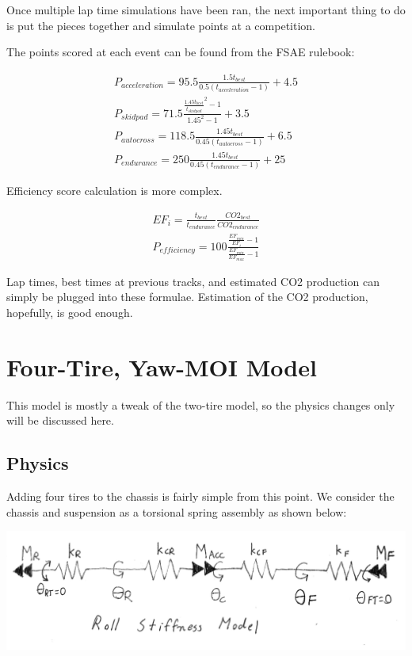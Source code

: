 \documentclass{article}
\begin{document}
Once multiple lap time simulations have been ran, the next important thing to do is put the pieces together and simulate points at a competition.

The points scored at each event can be found from the FSAE rulebook:

\begin{align}
	P_{acceleration} = 95.5 \frac{1.5 t_{best}}{0.5 (t_{acceleration} - 1)} + 4.5 \\
	P_{skidpad} = 71.5 \frac{\frac{1.45 t_{best}}{t_{skidpad}}^2 -1}{1.45^2 - 1} + 3.5 \\
	P_{autocross} = 118.5 \frac{1.45 t_{best}}{0.45 (t_{autocross} - 1)} + 6.5 \\
	P_{endurance} = 250 \frac{1.45 t_{best}}{0.45 (t_{endurance} - 1)} + 25
\end{align}

Efficiency score calculation is more complex.

\begin{align}
	EF_i = \frac{t_{best}}{t_{endurance}} \frac{CO2_{best}}{CO2_{endurance}} \\
	P_{efficiency} = 100 \frac{\frac{EF_{min}}{EF_i}-1}{\frac{EF_{min}}{EF_{max}}-1}
\end{align}

Lap times, best times at previous tracks, and estimated CO2 production can simply be plugged into these formulae. Estimation of the CO2 production, hopefully, is good enough.

\section{Four-Tire, Yaw-MOI Model}

This model is mostly a tweak of the two-tire model, so the physics changes only will be discussed here.

\subsection{Physics}

Adding four tires to the chassis is fairly simple from this point. We consider the chassis and suspension as a torsional spring assembly as shown below:

\includegraphics{tors_springs.png}
\end{document}
